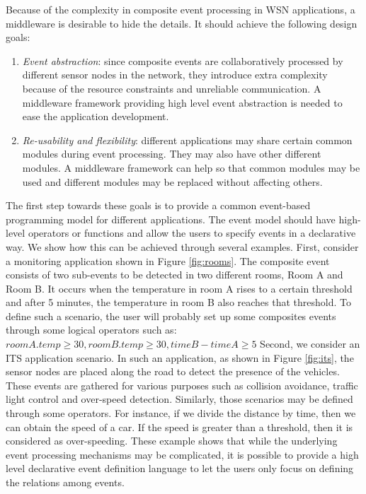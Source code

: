 Because of the complexity in composite event processing in WSN applications, a middleware is desirable to hide the details. It should achieve the following design goals:
\begin{enumerate}
\item \emph{Event abstraction}: since composite events are collaboratively processed by different sensor nodes in the network, they introduce extra complexity because of the resource constraints and unreliable communication. A middleware framework providing high level event abstraction is needed to ease the application development.
\item \emph{Re-usability and flexibility}: different applications may share certain common modules during event processing. They may also have other different modules. A middleware framework can help so that common modules may be used and different modules may be replaced without affecting others.
\end{enumerate}

The first step towards these goals is to provide a common event-based programming model for different applications. The event model should have high-level operators or functions and allow the users to specify events in a declarative way. We show how this can be achieved through several examples. First, consider a monitoring application shown in Figure \ref{fig:rooms}. The composite event consists of two sub-events to be detected in two different rooms, Room A and Room B. It occurs when the temperature in room A rises to a certain threshold and after 5 minutes, the temperature in room B also reaches that threshold. To define such a scenario, the user will probably set up some composites events through some logical operators such as: \(roomA.temp \geq 30, roomB.temp \geq 30, timeB - timeA \geq 5\) Second, we consider an ITS application scenario. In such an application, as shown in Figure \ref{fig:its}, the sensor nodes are placed along the road to detect the presence of the vehicles. These events are gathered for various purposes such as collision avoidance, traffic light control and over-speed detection. Similarly, those scenarios may be defined through some operators. For instance, if we divide the distance by time, then we can obtain the speed of a car. If the speed is greater than a threshold, then it is considered as over-speeding. These example shows that while the underlying event processing mechanisms may be complicated, it is possible to provide a high level declarative event definition language to let the users only focus on defining the relations among events.

